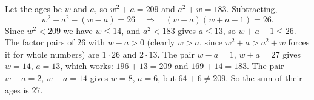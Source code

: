 Let the ages be $w$ and $a$, so $w^2+a=209$ and $a^2+w=183$. Subtracting,
\[
w^2-a^2-(w-a)=26\quad\Longrightarrow\quad(w-a)(w+a-1)=26 .
\]
Since $w^2<209$ we have $w\le14$, and $a^2<183$ gives $a\le13$, so $w+a-1\le26$. The factor pairs of $26$ with $w-a>0$ (clearly $w>a$, since $w^2+a>a^2+w$ forces it for whole numbers) are $1\cdot26$ and $2\cdot13$. The pair $w-a=1$, $w+a=27$ gives $w=14$, $a=13$, which works: $196+13=209$ and $169+14=183$. The pair $w-a=2$, $w+a=14$ gives $w=8$, $a=6$, but $64+6\ne209$. So the sum of their ages is $\boxed{27}$.
